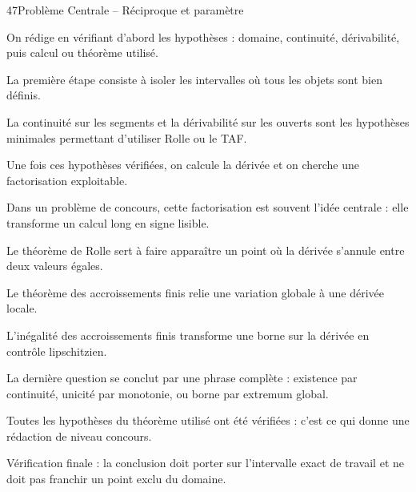 \documentclass[11pt,a4paper]{article}
\begin{document}
\begin{corrbox}{47}{Problème Centrale -- Réciproque et paramètre}

\begin{methodebox}
On rédige en vérifiant d'abord les hypothèses : domaine, continuité, dérivabilité, puis calcul ou théorème utilisé.
\end{methodebox}

La première étape consiste à isoler les intervalles où tous les objets sont bien définis.


La continuité sur les segments et la dérivabilité sur les ouverts sont les hypothèses minimales permettant d'utiliser Rolle ou le TAF.


Une fois ces hypothèses vérifiées, on calcule la dérivée et on cherche une factorisation exploitable.


Dans un problème de concours, cette factorisation est souvent l'idée centrale : elle transforme un calcul long en signe lisible.


Le théorème de Rolle sert à faire apparaître un point où la dérivée s'annule entre deux valeurs égales.


Le théorème des accroissements finis relie une variation globale à une dérivée locale.


L'inégalité des accroissements finis transforme une borne sur la dérivée en contrôle lipschitzien.


La dernière question se conclut par une phrase complète : existence par continuité, unicité par monotonie, ou borne par extremum global.


Toutes les hypothèses du théorème utilisé ont été vérifiées : c'est ce qui donne une rédaction de niveau concours.


\begin{attentionbox}
Vérification finale : la conclusion doit porter sur l'intervalle exact de travail et ne doit pas franchir un point exclu du domaine.
\end{attentionbox}

\end{corrbox}
\end{document}
